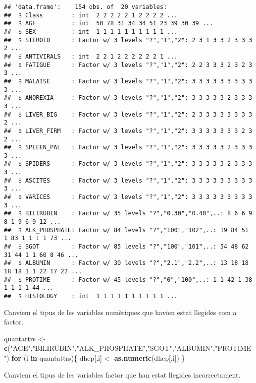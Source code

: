 \documentclass[]{article}
\newenvironment{Shaded}{\begin{snugshade}}{\end{snugshade}}
\newcommand{\ControlFlowTok}[1]{\textcolor[rgb]{0.13,0.29,0.53}{\textbf{#1}}}
\newcommand{\KeywordTok}[1]{\textcolor[rgb]{0.13,0.29,0.53}{\textbf{#1}}}
\newcommand{\NormalTok}[1]{#1}
\newcommand{\StringTok}[1]{\textcolor[rgb]{0.31,0.60,0.02}{#1}}
\begin{document}
\begin{verbatim}
## 'data.frame':    154 obs. of  20 variables:
##  $ Class        : int  2 2 2 2 2 1 2 2 2 2 ...
##  $ AGE          : int  50 78 31 34 34 51 23 39 30 39 ...
##  $ SEX          : int  1 1 1 1 1 1 1 1 1 1 ...
##  $ STEROID      : Factor w/ 3 levels "?","1","2": 2 3 1 3 3 2 3 3 3 2 ...
##  $ ANTIVIRALS   : int  2 2 1 2 2 2 2 2 2 1 ...
##  $ FATIGUE      : Factor w/ 3 levels "?","1","2": 2 2 3 3 3 2 3 2 3 3 ...
##  $ MALAISE      : Factor w/ 3 levels "?","1","2": 3 3 3 3 3 3 3 3 3 3 ...
##  $ ANOREXIA     : Factor w/ 3 levels "?","1","2": 3 3 3 3 3 2 3 3 3 3 ...
##  $ LIVER_BIG    : Factor w/ 3 levels "?","1","2": 2 3 3 3 3 3 3 3 3 2 ...
##  $ LIVER_FIRM   : Factor w/ 3 levels "?","1","2": 3 3 3 3 3 3 3 2 3 2 ...
##  $ SPLEEN_PAL   : Factor w/ 3 levels "?","1","2": 3 3 3 3 3 2 3 3 3 3 ...
##  $ SPIDERS      : Factor w/ 3 levels "?","1","2": 3 3 3 3 3 2 3 3 3 3 ...
##  $ ASCITES      : Factor w/ 3 levels "?","1","2": 3 3 3 3 3 3 3 3 3 3 ...
##  $ VARICES      : Factor w/ 3 levels "?","1","2": 3 3 3 3 3 3 3 3 3 3 ...
##  $ BILIRUBIN    : Factor w/ 35 levels "?","0.30","0.40",..: 8 6 6 9 8 1 9 6 9 12 ...
##  $ ALK_PHOSPHATE: Factor w/ 84 levels "?","100","102",..: 19 84 51 1 83 1 1 1 1 73 ...
##  $ SGOT         : Factor w/ 85 levels "?","100","101",..: 54 48 62 31 44 1 1 60 8 46 ...
##  $ ALBUMIN      : Factor w/ 30 levels "?","2.1","2.2",..: 13 18 18 18 18 1 1 22 17 22 ...
##  $ PROTIME      : Factor w/ 45 levels "?","0","100",..: 1 1 42 1 38 1 1 1 1 44 ...
##  $ HISTOLOGY    : int  1 1 1 1 1 1 1 1 1 1 ...
\end{verbatim}

Canviem el tipus de les variables numèriques que havien estat llegides
com a factor.

\begin{Shaded}
\begin{Highlighting}[]
\NormalTok{quantattrs <-}\StringTok{ }\KeywordTok{c}\NormalTok{(}\StringTok{"AGE"}\NormalTok{,}\StringTok{"BILIRUBIN"}\NormalTok{,}\StringTok{"ALK_PHOSPHATE"}\NormalTok{,}\StringTok{"SGOT"}\NormalTok{,}\StringTok{"ALBUMIN"}\NormalTok{,}\StringTok{"PROTIME"}\NormalTok{)}
\ControlFlowTok{for}\NormalTok{ (i }\ControlFlowTok{in}\NormalTok{ quantattrs)\{}
\NormalTok{  dhep[,i] <-}\StringTok{ }\KeywordTok{as.numeric}\NormalTok{(dhep[,i])}
\NormalTok{\}}
\end{Highlighting}
\end{Shaded}

Canviem el tipus de les variables factor que han estat llegides
incorrectament.
\end{document}
